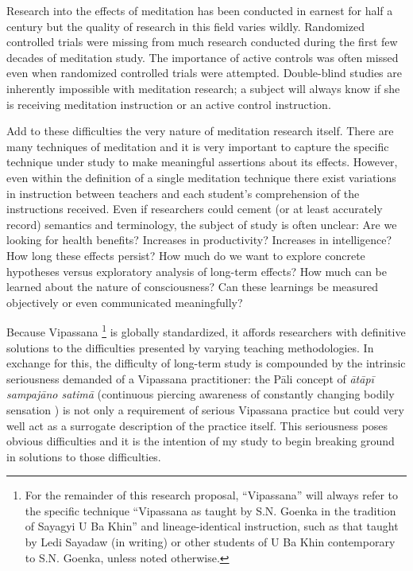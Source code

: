 \documentclass[a4paper, amsfonts, amssymb, amsmath, reprint, showkeys, nofootinbib, twoside]{revtex4-1}
\begin{document}
Research into the effects of meditation has been conducted in earnest for half a
century but the quality of research in this field varies wildly. Randomized
controlled trials were missing from much research conducted during the first few
decades of meditation study. The importance of active controls was often missed even
when randomized controlled trials were attempted. Double-blind studies are inherently
impossible with meditation research; a subject will always know if she is receiving
meditation instruction or an active control instruction. \cite{goleman2017altered}

Add to these difficulties the very nature of meditation research itself. There are
many techniques of meditation and it is very important to capture the specific
technique under study to make meaningful assertions about its
effects. \cite{goleman2017altered} However, even within the definition of a single
meditation technique there exist variations in instruction between
teachers and each student's comprehension of the instructions
received. \cite{davidson2015conceptual} Even if researchers could cement (or at least
accurately record) semantics and terminology, the subject of study is often unclear:
Are we looking for health benefits? Increases in productivity? Increases in
intelligence? How long these effects persist? How much do we want to explore concrete
hypotheses versus exploratory analysis of long-term effects? How much can be learned
about the nature of consciousness? Can these learnings be measured objectively or
even communicated meaningfully?

Because Vipassana \footnote{For the remainder of this research proposal,
  ``Vipassana'' will always refer to the specific technique ``Vipassana as taught by S.N. Goenka in the
  tradition of Sayagyi U Ba Khin'' and lineage-identical instruction, such as that
  taught by Ledi Sayadaw (in writing) or other students of U Ba Khin contemporary
  to S.N. Goenka, unless noted otherwise.} is globally standardized, it affords
researchers with definitive
solutions to the difficulties presented by varying teaching methodologies. In
exchange for this, the difficulty of long-term study is compounded by the intrinsic
seriousness demanded of a Vipassana practitioner: the Pāli concept of \textit{ātāpī
  sampajāno satimā} (continuous piercing awareness of constantly
changing bodily sensation \cite{goenka1999discourses, analayo2003satipatthana})
is not only a
requirement of serious Vipassana practice but could very well act as a surrogate
description of the practice itself. This seriousness poses obvious difficulties and
it is the intention of my study to begin breaking ground in solutions to those
difficulties.
\end{document}
